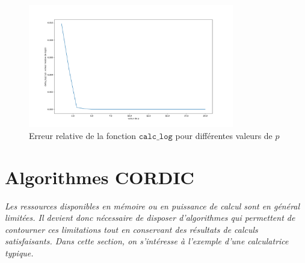 \documentclass{article}
\begin{document}
\begin{figure}[H]
 \centering
 \includegraphics[width=0.8\textwidth]{partie2_relative_error_log.png}
 \caption{Erreur relative de la fonction $\texttt{calc\_log}$ pour différentes valeurs de $p$}
 \label{fig:relative_error_log}        
\end{figure}

\section{Algorithmes CORDIC}
\label{sec:cordic}

\textit{Les ressources disponibles en m\'emoire ou en puissance de calcul sont en g\'en\'eral limit\'ees. Il devient donc n\'ecessaire de disposer d'algorithmes qui permettent de contourner ces limitations tout en conservant des résultats de calculs satisfaisants. Dans cette section, on s'int\'eresse à l'exemple d'une calculatrice typique.}
\vskip 1mm ~
\end{document}
